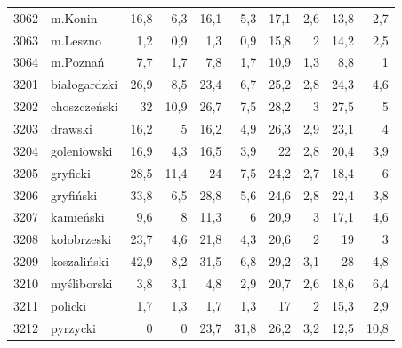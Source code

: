 \begin{center}
\begin{longtable}{lp{3cm}rrrrrrrr}
3062 & m.Konin                 & 16,8    & 6,3         & 16,1     & 5,3          & 17,1     & 2,6          & 13,8     & 2,7          \\
3063 & m.Leszno                & 1,2     & 0,9         & 1,3      & 0,9          & 15,8     & 2            & 14,2     & 2,5          \\
3064 & m.Poznań                & 7,7     & 1,7         & 7,8      & 1,7          & 10,9     & 1,3          & 8,8      & 1            \\
3201 & białogardzki            & 26,9    & 8,5         & 23,4     & 6,7          & 25,2     & 2,8          & 24,3     & 4,6          \\
3202 & choszczeński            & 32      & 10,9        & 26,7     & 7,5          & 28,2     & 3            & 27,5     & 5            \\
3203 & drawski                 & 16,2    & 5           & 16,2     & 4,9          & 26,3     & 2,9          & 23,1     & 4            \\
3204 & goleniowski             & 16,9    & 4,3         & 16,5     & 3,9          & 22       & 2,8          & 20,4     & 3,9          \\
3205 & gryficki                & 28,5    & 11,4        & 24       & 7,5          & 24,2     & 2,7          & 18,4     & 6            \\
3206 & gryfiński               & 33,8    & 6,5         & 28,8     & 5,6          & 24,6     & 2,8          & 22,4     & 3,8          \\
3207 & kamieński               & 9,6     & 8           & 11,3     & 6            & 20,9     & 3            & 17,1     & 4,6          \\
3208 & kołobrzeski             & 23,7    & 4,6         & 21,8     & 4,3          & 20,6     & 2            & 19       & 3            \\
3209 & koszaliński             & 42,9    & 8,2         & 31,5     & 6,8          & 29,2     & 3,1          & 28       & 4,8          \\
3210 & myśliborski             & 3,8     & 3,1         & 4,8      & 2,9          & 20,7     & 2,6          & 18,6     & 6,4          \\
3211 & policki                 & 1,7     & 1,3         & 1,7      & 1,3          & 17       & 2            & 15,3     & 2,9          \\
3212 & pyrzycki                & 0       & 0           & 23,7     & 31,8         & 26,2     & 3,2          & 12,5     & 10,8         \\

\end{longtable}
\end{center}
